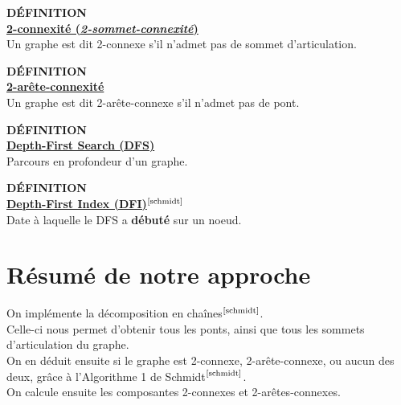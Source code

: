 \documentclass{article}      %
\begin{document}
\begin{definition}
{ \scriptsize \textcolor{definition}{ \textbf{DÉFINITION}}}
\vspace{3px}
\\ \underline{\textbf{2-connexité (\textit{2-sommet-connexité})}}
\vspace{2.5px}
\\ Un graphe est dit 2-connexe s'il n'admet pas de sommet d'articulation.
\end{definition}

\begin{definition}
{ \scriptsize \textcolor{definition}{ \textbf{DÉFINITION}}}
\vspace{3px}
\\ \underline{\textbf{2-arête-connexité}}
\vspace{2.5px}
\\ Un graphe est dit 2-arête-connexe s'il n'admet pas de pont.
\end{definition}

\begin{definition}
{ \scriptsize \textcolor{definition}{ \textbf{DÉFINITION}}}
\vspace{3px}
\\ \underline{\textbf{Depth-First Search (DFS)}}
\vspace{2.5px}
\\ Parcours en profondeur d'un graphe.
\end{definition}

\begin{definition}
{ \scriptsize \textcolor{definition}{ \textbf{DÉFINITION}}}
\vspace{3px}
\\ \underline{\textbf{Depth-First Index (DFI)$^\text{\cite{schmidt}}$}}
\vspace{2.5px}
\\ Date à laquelle le DFS a \textbf{débuté} sur un noeud.
\end{definition}

\section{Résumé de notre approche}
On implémente la décomposition en chaînes$^\text{\cite{schmidt}}$.
\\Celle-ci nous permet d'obtenir tous les ponts, ainsi que tous les sommets d'articulation du graphe.
\\On en déduit ensuite si le graphe est 2-connexe, 2-arête-connexe, ou aucun des deux, grâce à l'Algorithme 1 de Schmidt$^\text{\cite{schmidt}}$.
\\On calcule ensuite les composantes 2-connexes et 2-arêtes-connexes.
%
\end{document}
